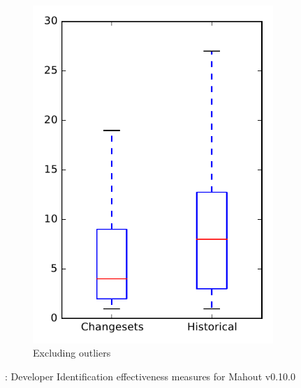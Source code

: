 \begin{figure}
\begin{subfigure}{.4\textwidth}
        \includegraphics[height=0.4\textheight]{figures/dit/rq2_mahout_no_outlier}
        \caption{Excluding outliers}\label{fig:dit:rq2:mahout_no_outlier}
    \end{subfigure}
\caption{\dtwo: Developer Identification effectiveness measures for Mahout v0.10.0}
\label{fig:dit:rq2:mahout}
\end{figure}
